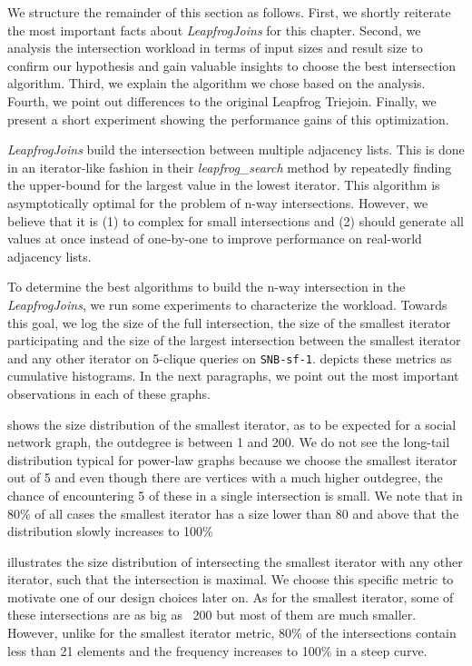 We structure the remainder of this section as follows.
First, we shortly reiterate the most important facts about \textit{LeapfrogJoins} for this chapter.
Second, we analysis the intersection workload in terms of input sizes and result size to confirm our hypothesis
and gain valuable insights to choose the best intersection algorithm.
Third, we explain the algorithm we chose based on the analysis.
Fourth, we point out differences to the original Leapfrog Triejoin.
Finally, we present a short experiment showing the performance gains of this optimization.

\textit{LeapfrogJoins} build the intersection between multiple adjacency lists.
This is done in an iterator-like fashion in their \textit{leapfrog\_search} method by repeatedly finding the upper-bound for the largest
value in the lowest iterator.
This algorithm is asymptotically optimal for the problem of n-way intersections.
However, we believe that it is (1) to complex for small intersections and (2) should generate all values at once instead of one-by-one to
improve performance on real-world adjacency lists.

To determine the best algorithms to build the n-way intersection in the \textit{LeapfrogJoins},
we run some experiments to characterize the workload.
Towards this goal, we log the size of the full intersection, the size of the smallest iterator participating
and the size of the largest intersection between the smallest iterator and any other iterator on 5-clique queries on \texttt{SNB-sf-1}.
 depicts these metrics as cumulative histograms.
In the next paragraphs, we point out the most important observations in each of these graphs.

 shows the size distribution of the smallest iterator, as to be expected for a social network
graph, the outdegree is between 1 and 200.
We do not see the long-tail distribution typical for power-law graphs because we choose the smallest iterator out of 5 and even
though there are vertices with a much higher outdegree, the chance of encountering 5 of these in a single intersection is small.
We note that in 80\% of all cases the smallest iterator has a size lower than 80 and above that the distribution slowly increases to 100\%

 illustrates the size distribution of intersecting the smallest iterator with any other
iterator, such that the intersection is maximal.
We choose this specific metric to motivate one of our design choices later on.
As for the smallest iterator, some of these intersections are as big as ~200 but most of them are much smaller.
However, unlike for the smallest iterator metric, 80\% of the intersections contain less than 21  elements and the frequency increases to
100\% in a steep curve.

